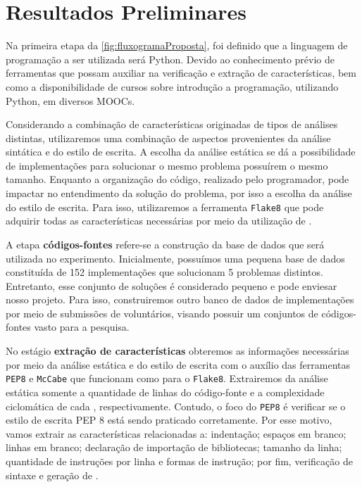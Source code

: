 \chapter{Resultados Preliminares}
\label{chap:Result}

	Na primeira etapa da \cref{fig:fluxogramaProposta}, foi definido que a linguagem
	de programação a ser utilizada será Python. Devido ao conhecimento prévio de
	ferramentas que possam auxiliar na verificação e extração de características,
	bem como a disponibilidade de cursos sobre introdução a programação, utilizando
	Python, em diversos MOOCs.
	
	Considerando a combinação de características originadas de tipos de análises
	distintas, utilizaremos uma combinação de aspectos provenientes da análise
	sintática e do estilo de escrita. A escolha da análise estática se dá a
	possibilidade de implementações para solucionar o mesmo problema possuírem
	o mesmo tamanho. Enquanto a organização do código, realizado pelo programador,
	pode impactar no entendimento da solução do problema, por isso a escolha da
	análise do estilo de escrita. Para isso, utilizaremos a ferramenta \texttt{Flake8}
	\cite{flake8} que pode adquirir todas as características necessárias por meio da
	utilização de .
	
	A etapa \textbf{códigos-fontes} refere-se a construção da base de dados que será
	utilizada no experimento. Inicialmente, possuímos uma pequena base de dados
	constituída de 152 implementações que solucionam 5 problemas distintos. Entretanto,
	esse conjunto de soluções é considerado pequeno e pode enviesar nosso projeto.
	Para isso, construiremos outro banco de dados de implementações por meio de
	submissões de voluntários, visando possuir um conjuntos de códigos-fontes vasto
	para a pesquisa. 
	
	No estágio \textbf{extração de características} obteremos as informações necessárias
	por meio da análise estática e do estilo de escrita com o auxílio das ferramentas
	\texttt{PEP8} \cite{pep8} e \texttt{McCabe} \cite{mccabe} que funcionam como  para o
	\texttt{Flake8}. Extrairemos da análise estática somente a quantidade de linhas
	do código-fonte e a complexidade ciclomática de cada ,
	respectivamente. Contudo, o foco do \texttt{PEP8} é verificar se o estilo de
	escrita PEP 8 \cite{van2001pep} está sendo praticado corretamente. Por esse
	motivo, vamos extrair as características relacionadas a: indentação; espaços em
	branco; linhas em branco; declaração de importação de bibliotecas; tamanho da
	linha; quantidade de instruções por linha e formas de instrução;
	por fim, verificação de sintaxe e geração de .
	
